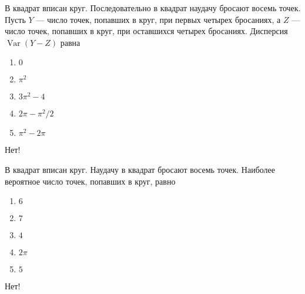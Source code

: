 \documentclass[t]{beamer}
\DeclareMathOperator{\Var}{Var}
\begin{document}
 \begin{frame} \label{11-No} 
\begin{block}{11} 

В квадрат вписан круг. Последовательно в квадрат наудачу бросают восемь точек. Пусть $Y$ — число точек, попавших в круг, при первых четырех бросаниях, а $Z$ — число точек, попавших в круг, при оставшихся четырех бросаниях. Дисперсия $\Var(Y - Z)$ равна
 


 \end{block} 
\begin{enumerate} 
\item[] \hyperlink{11-No}{\beamergotobutton{}  $0$
}
\item[] \hyperlink{11-No}{\beamergotobutton{} $\pi^2$}
\item[] \hyperlink{11-No}{\beamergotobutton{} $3\pi^2 - 4$}
\item[] \hyperlink{11-Yes}{\beamergotobutton{} $2\pi - \pi^2 / 2$}
\item[] \hyperlink{11-No}{\beamergotobutton{} $\pi^2 - 2 \pi$}
\end{enumerate} 

 \alert{Нет!} 
\end{frame} 


 \begin{frame} \label{12-No} 
\begin{block}{12} 

В квадрат вписан круг. Наудачу в квадрат бросают восемь точек. Наиболее вероятное число точек, попавших в круг, равно
 


 \end{block} 
\begin{enumerate} 
\item[] \hyperlink{12-No}{\beamergotobutton{} $6$
}
\item[] \hyperlink{12-Yes}{\beamergotobutton{} $7$}
\item[] \hyperlink{12-No}{\beamergotobutton{} $4$}
\item[] \hyperlink{12-No}{\beamergotobutton{} $2\pi$}
\item[] \hyperlink{12-No}{\beamergotobutton{} $5$}
\end{enumerate} 

 \alert{Нет!} 
\end{frame} 
\end{document}
